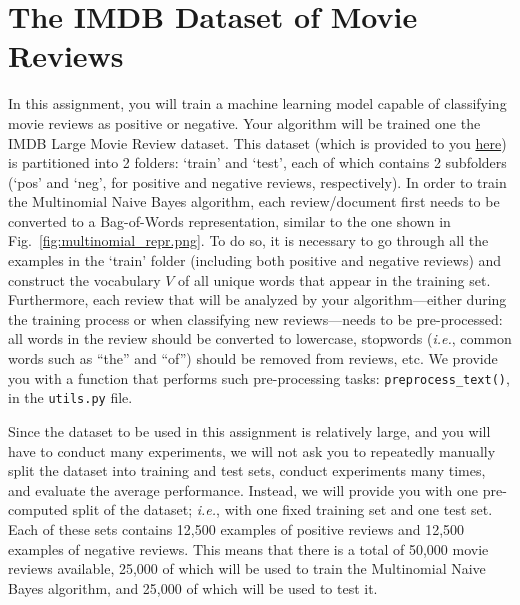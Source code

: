 \documentclass[letterpaper]{article}
\begin{document}
\section{The IMDB Dataset of Movie Reviews}

In this assignment, you will train a machine learning model capable of classifying movie reviews as positive or negative. Your algorithm will be trained one the IMDB Large Movie Review dataset. This dataset (which is provided to you \href{https://people.cs.umass.edu/~bsilva/courses/CMPSCI_589/Spring2022/homeworks/hw2.zip}{here}) is partitioned into 2 folders: ‘train’ and ‘test’, each of which contains 2 subfolders (‘pos’ and ‘neg’, for positive and negative reviews, respectively). In order to train the Multinomial Naive Bayes algorithm, each review/document first needs to be converted to a Bag-of-Words representation, similar to the one shown in Fig.~\ref{fig:multinomial_repr.png}. To do so, it is necessary to go through all the examples in the ‘train’ folder (including both positive and negative reviews) and construct the vocabulary $V$ of all unique words that appear in the training set. Furthermore, each review that will be analyzed by your algorithm---either during the training process or when classifying new reviews---needs to be pre-processed: all words in the review should be converted to lowercase, stopwords (\textit{i.e.}, common words such as ``the'' and ``of'') should be removed from reviews, etc. We provide you with a function that performs such pre-processing tasks: \texttt{preprocess\_text()}, in the \texttt{utils.py} file. 

Since the dataset to be used in this assignment is relatively large, and you will have to conduct many experiments, we will not ask you to repeatedly manually split the dataset into training and test sets, conduct experiments many times, and evaluate the average performance. Instead, we will provide you with one pre-computed split of the dataset; \textit{i.e.}, with one fixed training set and one test set. Each of these sets contains 12,500 examples of positive reviews and 12,500 examples of negative reviews. This means that there is a total of 50,000 movie reviews available, 25,000 of which will be used to train the Multinomial Naive Bayes algorithm, and 25,000 of which will be used to test it.
\end{document}
